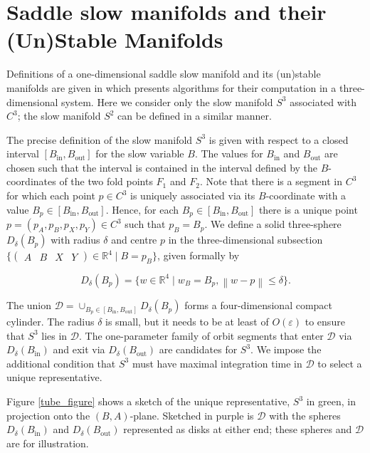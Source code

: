 \documentclass{ws-ijbc}
\begin{document}
 \section{Saddle slow manifolds and their (Un)Stable Manifolds}
    
Definitions of a one-dimensional saddle slow manifold and its (un)stable manifolds are given in \cite{Saeed_Paper} which presents algorithms for their computation in a three-dimensional system.  Here we consider only the slow manifold $S^3$ associated with $C^3$; the slow manifold $S^2$ can be defined in a similar manner.
    
The precise definition of the slow manifold $S^3$ is given with respect to a closed interval $[B_{\mathrm{in}},B_{\mathrm{out}}]$ for the slow variable $B$.  The values for $B_{\mathrm{in}}$ and $B_{\mathrm{out}}$ are chosen such that the interval is contained in the interval defined by the $B$-coordinates of the two fold points $F_1$ and $F_2$.  Note that there is a segment in $C^3$ for which each point $p \in C^3$ is uniquely associated via its $B$-coordinate with a value $B_p \in [B_{\mathrm{in}},B_{\mathrm{out}}]$.  Hence, for each $B_p \in [B_{\mathrm{in}},B_{\mathrm{out}}]$ there is a unique point $p=(p_A,p_B,p_X,p_Y) \in C^3$ such that $p_B = B_p$.  We define a solid three-sphere $D_\delta(B_p)$ with radius $\delta$ and centre $p$ in the three-dimensional subsection $\{ \begin{pmatrix} A & B & X & Y \end{pmatrix} \in \mathbb{R}^4 \; | \; B=p_B\}$, given formally by

\begin{equation*}
D_\delta(B_p)=\{w \in \mathbb{R}^4 \; | \; w_B = B_p, \left\lVert w-p \right\rVert \leq \delta\}.
\end{equation*}
    
\noindent
The union $\mathscr{D} = \cup_{B_p \in [B_{\mathrm{in}}, B_{\mathrm{out}}]} D_\delta(B_p)$ forms a four-dimensional compact cylinder.  The radius $\delta$ is small, but it needs to be at least of $O(\varepsilon)$ to ensure that $S^3$ lies in $\mathscr{D}$.  The one-parameter family of orbit segments that enter $\mathscr{D}$ via $D_\delta(B_{\mathrm{in}})$ and exit via $D_\delta(B_{\mathrm{out}})$ are candidates for $S^3$.   We impose the additional condition that $S^3$ must have maximal integration time in $\mathscr{D}$ to select a unique representative.
    
Figure \ref{tube_figure} shows a sketch of the unique representative, $S^3$ in green, in projection onto the $(B,A)$-plane.  Sketched in purple is $\mathscr{D}$ with the spheres $D_\delta(B_{\mathrm{in}})$ and $D_\delta(B_{\mathrm{out}})$ represented as disks at either end; these spheres and $\mathscr{D}$ are for illustration.
\end{document}
